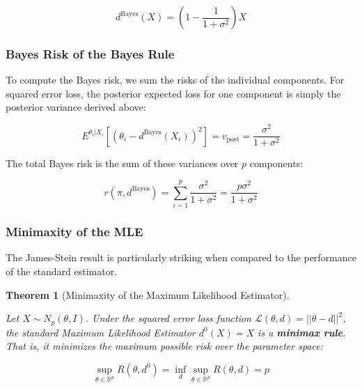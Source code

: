 \documentclass[
  letterpaper,
  DIV=11,
  numbers=noendperiod]{scrreprt}
\renewcommand{\[}{\begin{equation}}
\renewcommand{\]}{\end{equation}}
\theoremstyle{definition}
\theoremstyle{plain}
\theoremstyle{plain}
\theoremstyle{plain}
\newtheorem{theorem}{Theorem}[chapter]
\theoremstyle{definition}
\theoremstyle{plain}
\theoremstyle{remark}
\begin{document}
\[
d^{\text{Bayes}}(X) = \left( 1 - \frac{1}{1 + \sigma^2} \right) X
\]

\subsubsection{Bayes Risk of the Bayes
Rule}\label{bayes-risk-of-the-bayes-rule}

To compute the Bayes risk, we sum the risks of the individual
components. For squared error loss, the posterior expected loss for one
component is simply the posterior variance derived above:

\[
E^{\theta_i|X_i} [ (\theta_i - d^{\text{Bayes}}(X_i))^2 ] = v_{\text{post}} = \frac{\sigma^2}{1 + \sigma^2}
\]

The total Bayes risk is the sum of these variances over \(p\)
components:

\[
r(\pi, d^{\text{Bayes}}) = \sum_{i=1}^p \frac{\sigma^2}{1 + \sigma^2} = \frac{p\sigma^2}{1 + \sigma^2}
\]

\subsubsection{Minimaxity of the MLE}\label{minimaxity-of-the-mle}

The James-Stein result is particularly striking when compared to the
performance of the standard estimator.

\begin{theorem}[Minimaxity of the Maximum Likelihood
Estimator]\protect\hypertarget{thm-mle-minimax}{}\label{thm-mle-minimax}

Let \(X \sim N_p(\theta, I)\). Under the squared error loss function
\(\mathcal{L}(\theta, d) = ||\theta - d||^2\), the standard Maximum
Likelihood Estimator \(d^0(X) = X\) is a \textbf{minimax rule}. That is,
it minimizes the maximum possible risk over the parameter space:

\[
\sup_{\theta \in \mathbb{R}^p} R(\theta, d^0) = \inf_{d} \sup_{\theta \in \mathbb{R}^p} R(\theta, d) = p
\]

\end{theorem}
\end{document}
